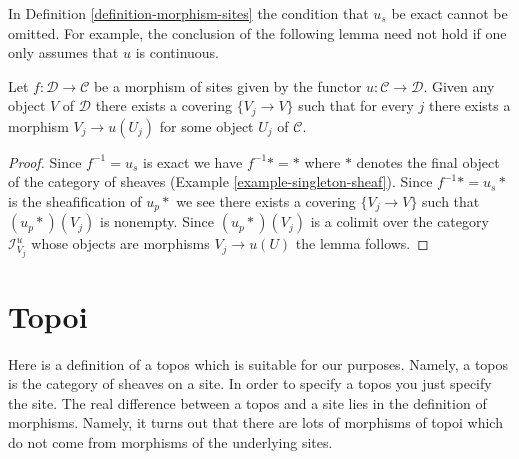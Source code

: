 \noindent
In Definition \ref{definition-morphism-sites} the condition that $u_s$
be exact cannot be omitted. For example, the conclusion of the following
lemma need not hold if one only assumes that $u$ is continuous.

\begin{lemma}
\label{lemma-morphism-of-sites-covering}
Let $f : \mathcal{D} \to \mathcal{C}$ be a morphism of sites given by the
functor $u : \mathcal{C} \to \mathcal{D}$. Given any object $V$ of
$\mathcal{D}$ there exists a covering $\{V_j \to V\}$ such that for every
$j$ there exists a morphism $V_j \to u(U_j)$ for some object $U_j$
of $\mathcal{C}$.
\end{lemma}

\begin{proof}
Since $f^{-1} = u_s$ is exact we have $f^{-1}* = *$ where $*$ denotes the
final object of the category of sheaves
(Example \ref{example-singleton-sheaf}).
Since $f^{-1}* = u_s*$ is the sheafification of $u_p*$ we see
there exists a covering $\{V_j \to V\}$ such that $(u_p*)(V_j)$
is nonempty. Since $(u_p*)(V_j)$ is a colimit over the category
$\mathcal{I}^u_{V_j}$ whose objects are morphisms $V_j \to u(U)$
the lemma follows.
\end{proof}



























\section{Topoi}
\label{section-topoi}

\noindent
Here is a definition of a topos which is suitable for our purposes.
Namely, a topos is the category of sheaves on a site. In order to specify
a topos you just specify the site. The real difference between a topos
and a site lies in the definition of morphisms. Namely, it turns out that
there are lots of morphisms of topoi which do not come from morphisms
of the underlying sites.

